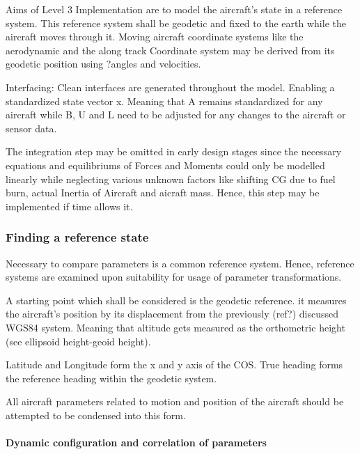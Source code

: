 Aims of Level 3 Implementation are to model the aircraft's state in a reference system. This reference system shall be geodetic and fixed to the earth while the aircraft moves through it. Moving aircraft coordinate systems like the aerodynamic and the along track Coordinate system may be derived from its geodetic position using ?angles and velocities.


Interfacing: Clean interfaces are generated throughout the model. Enabling a standardized state vector x. Meaning that A remains standardized for any aircraft while B, U and L need to be adjusted for any changes to the aircraft or sensor data.

The integration step may be omitted in early design stages since the necessary equations and equilibriums of Forces and Moments could only be modelled linearly while neglecting various unknown factors like shifting CG due to fuel burn, actual Inertia of Aircraft and aicraft mass. Hence, this step may be implemented if time allows it.

\subsubsection{Finding a reference state}



Necessary to compare parameters is a common reference system. Hence, reference systems are examined upon suitability for usage of parameter transformations.

A starting point which shall be considered is the geodetic reference. it measures the aircraft's position by its displacement from the previously (ref?) discussed WGS84 system. Meaning that altitude gets measured as the orthometric height (see ellipsoid height-geoid height).

Latitude and Longitude form the x and y axis of the COS. True heading forms the reference heading within the geodetic system.

All aircraft parameters related to motion and position of the aircraft should be attempted to be condensed into this form.

\paragraph{Dynamic configuration and correlation of parameters}

